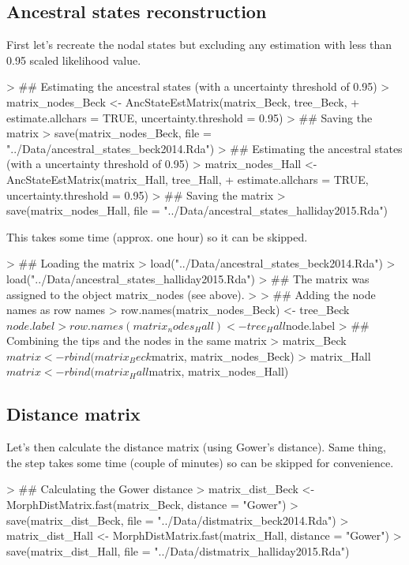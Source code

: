 \documentclass{article}
\begin{document}
\subsection{Ancestral states reconstruction}

First let's recreate the nodal states but excluding any estimation with less than 0.95 scaled likelihood value.

\begin{Schunk}
\begin{Sinput}
> ## Estimating the ancestral states (with a uncertainty threshold of 0.95)
> matrix_nodes_Beck <- AncStateEstMatrix(matrix_Beck, tree_Beck,
+     estimate.allchars = TRUE, uncertainty.threshold = 0.95)
> ## Saving the matrix
> save(matrix_nodes_Beck, file = "../Data/ancestral_states_beck2014.Rda")
> ## Estimating the ancestral states (with a uncertainty threshold of 0.95)
> matrix_nodes_Hall <- AncStateEstMatrix(matrix_Hall, tree_Hall,
+     estimate.allchars = TRUE, uncertainty.threshold = 0.95)
> ## Saving the matrix
> save(matrix_nodes_Hall, file = "../Data/ancestral_states_halliday2015.Rda")
\end{Sinput}
\end{Schunk}

This takes some time (approx. one hour) so it can be skipped.

\begin{Schunk}
\begin{Sinput}
> ## Loading the matrix
> load("../Data/ancestral_states_beck2014.Rda")
> load("../Data/ancestral_states_halliday2015.Rda")
> ## The matrix was assigned to the object matrix_nodes (see above).
> 
> ## Adding the node names as row names
> row.names(matrix_nodes_Beck) <- tree_Beck$node.label
> row.names(matrix_nodes_Hall) <- tree_Hall$node.label
> ## Combining the tips and the nodes in the same matrix
> matrix_Beck$matrix <- rbind(matrix_Beck$matrix, matrix_nodes_Beck) 
> matrix_Hall$matrix <- rbind(matrix_Hall$matrix, matrix_nodes_Hall) 
\end{Sinput}
\end{Schunk}

\subsection{Distance matrix}

Let's then calculate the distance matrix (using Gower's distance).
Same thing, the step takes some time (couple of minutes) so can be skipped for convenience.

\begin{Schunk}
\begin{Sinput}
> ## Calculating the Gower distance
> matrix_dist_Beck <- MorphDistMatrix.fast(matrix_Beck, distance = "Gower")
> save(matrix_dist_Beck, file = "../Data/distmatrix_beck2014.Rda")
> matrix_dist_Hall <- MorphDistMatrix.fast(matrix_Hall, distance = "Gower")
> save(matrix_dist_Hall, file = "../Data/distmatrix_halliday2015.Rda")
\end{Sinput}
\end{Schunk}
\end{document}
